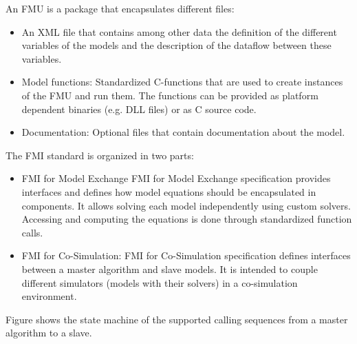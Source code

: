 

An FMU is a package that encapsulates different files:

\begin{itemize}
\item An XML file that contains among other data the definition of the different variables of the models and the description of the dataflow between these variables. 
\item Model functions: Standardized C-functions that are used to create instances of the FMU and run them. The functions can be provided as platform dependent binaries (e.g. DLL files) or as C source code.
\item Documentation: Optional files that contain documentation about the model.
\end{itemize}

The FMI standard is organized in two parts:
\begin{itemize}
\item FMI for Model Exchange
FMI for Model Exchange specification provides interfaces and defines how model equations should be encapsulated in components. It allows solving each model independently using custom solvers. Accessing and computing the equations is done through standardized function calls.

\item FMI for Co-Simulation:
FMI for Co-Simulation specification defines interfaces between a master algorithm and slave models. It is intended to couple different simulators (models with their solvers) in a co-simulation environment.
\end{itemize}
Figure shows the state machine of the supported calling sequences from a master algorithm to a slave.




